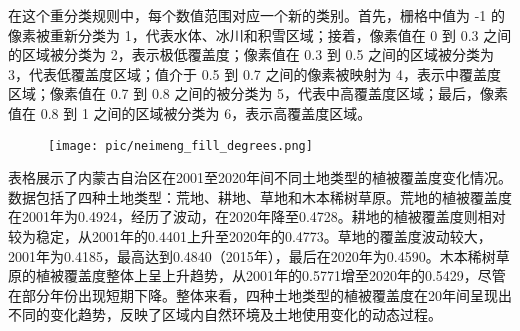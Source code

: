 \documentclass{article}
\begin{document}
		
		\par 在这个重分类规则中，每个数值范围对应一个新的类别。首先，栅格中值为 -1 的像素被重新分类为 1，代表水体、冰川和积雪区域；接着，像素值在 0 到 0.3 之间的区域被分类为 2，表示极低覆盖度；像素值在 0.3 到 0.5 之间的区域被分类为 3，代表低覆盖度区域；值介于 0.5 到 0.7 之间的像素被映射为 4，表示中覆盖度区域；像素值在 0.7 到 0.8 之间的被分类为 5，代表中高覆盖度区域；最后，像素值在 0.8 到 1 之间的区域被分类为 6，表示高覆盖度区域。
		\begin{figure}[H]  %
			\centering
			\texttt{[image: pic/neimeng\_fill\_degrees.png]} %
		\end{figure}
		\par	表格展示了内蒙古自治区在2001至2020年间不同土地类型的植被覆盖度变化情况。数据包括了四种土地类型：荒地、耕地、草地和木本稀树草原。荒地的植被覆盖度在2001年为0.4924，经历了波动，在2020年降至0.4728。耕地的植被覆盖度则相对较为稳定，从2001年的0.4401上升至2020年的0.4773。草地的覆盖度波动较大，2001年为0.4185，最高达到0.4840（2015年），最后在2020年为0.4590。木本稀树草原的植被覆盖度整体上呈上升趋势，从2001年的0.5771增至2020年的0.5429，尽管在部分年份出现短期下降。整体来看，四种土地类型的植被覆盖度在20年间呈现出不同的变化趋势，反映了区域内自然环境及土地使用变化的动态过程。
\end{document}
